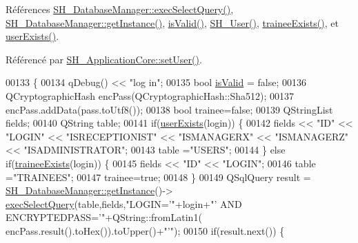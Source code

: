 Références \hyperlink{classSH__DatabaseManager_ab8f9850cb68444ab9a4e613b36a3b044}{S\-H\-\_\-\-Database\-Manager\-::exec\-Select\-Query()}, \hyperlink{classSH__DatabaseManager_a31198eb4de0f8b18e3fa0eed09f24d19}{S\-H\-\_\-\-Database\-Manager\-::get\-Instance()}, \hyperlink{classSH__User_a07de5c02b2a02b3bb2b0aaf0886bb4d9}{is\-Valid()}, \hyperlink{classSH__User_a96c0ebb3f11c1654935aaecb92295724}{S\-H\-\_\-\-User()}, \hyperlink{classSH__User_adfc35c967cb405f4a14886676612fbb7}{trainee\-Exists()}, et \hyperlink{classSH__User_a64161b35866b1c635d5f4214095a2b1e}{user\-Exists()}.



Référencé par \hyperlink{classSH__ApplicationCore_a2dd5c029a2ea348f1dfd0a60dea476e4}{S\-H\-\_\-\-Application\-Core\-::set\-User()}.


\begin{DoxyCode}
00133 \{
00134     qDebug() << \textcolor{stringliteral}{"log in"};
00135     \textcolor{keywordtype}{bool} \hyperlink{classSH__User_a07de5c02b2a02b3bb2b0aaf0886bb4d9}{isValid} = \textcolor{keyword}{false};
00136     QCryptographicHash encPass(QCryptographicHash::Sha512);
00137     encPass.addData(pass.toUtf8());
00138     \textcolor{keywordtype}{bool} trainee=\textcolor{keyword}{false};
00139     QStringList fields;
00140     QString table;
00141     \textcolor{keywordflow}{if}(\hyperlink{classSH__User_a64161b35866b1c635d5f4214095a2b1e}{userExists}(login)) \{
00142         fields << \textcolor{stringliteral}{"ID"} << \textcolor{stringliteral}{"LOGIN"} << \textcolor{stringliteral}{"ISRECEPTIONIST"} << \textcolor{stringliteral}{"ISMANAGERX"} << \textcolor{stringliteral}{"ISMANAGERZ"} << \textcolor{stringliteral}{"ISADMINISTRATOR"};
00143         table =\textcolor{stringliteral}{"USERS"};
00144     \} \textcolor{keywordflow}{else} \textcolor{keywordflow}{if}(\hyperlink{classSH__User_adfc35c967cb405f4a14886676612fbb7}{traineeExists}(login)) \{
00145         fields << \textcolor{stringliteral}{"ID"} << \textcolor{stringliteral}{"LOGIN"};
00146         table =\textcolor{stringliteral}{"TRAINEES"};
00147         trainee=\textcolor{keyword}{true};
00148     \}
00149     QSqlQuery result = \hyperlink{classSH__DatabaseManager_a31198eb4de0f8b18e3fa0eed09f24d19}{SH\_DatabaseManager::getInstance}()->
      \hyperlink{classSH__DatabaseManager_ab8f9850cb68444ab9a4e613b36a3b044}{execSelectQuery}(table,fields,\textcolor{stringliteral}{"LOGIN='"}+login+\textcolor{stringliteral}{"' AND ENCRYPTEDPASS='"}+QString::fromLatin1(
      encPass.result().toHex()).toUpper()+\textcolor{stringliteral}{"'"});
00150     \textcolor{keywordflow}{if}(result.next()) \{

\end{DoxyCode}
